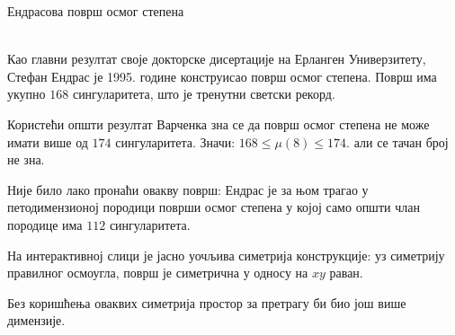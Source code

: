 \documentclass[sr]{./../../common/SurferDesc}%
\begin{document}
\footnotesize




\begin{surferPage}
  \begin{surferTitle}Ендрасова површ осмог степена\end{surferTitle} \\
    Као главни резултат своје докторске дисертације на Ерланген Универзитету, 
	Стефан Ендрас је 1995. године конструисао површ осмог степена.
    Површ има укупно $168$ сингуларитета, што је тренутни светски рекорд. 
  
    Користећи општи резултат Варченка зна се да површ осмог степена не може имати 
    више од  $174$ сингуларитета.
    Значи: $168 \le \mu(8) \le 174$. 
    али се тачан број не зна.

    Није било лако пронаћи овакву површ: Ендрас је за њом трагао у петодимензионој 
    породици површи осмог степена у којој само општи члан породице има 
    $112$ сингуларитета.

    На интерактивној слици је јасно уочљива симетрија конструкције: 
    уз симетрију правилног осмоугла, површ је симетрична у односу на $xy$ раван.

    Без коришћења оваквих симетрија простор за претрагу би био још више димензије.
  \begin{surferText}
     \end{surferText}
\end{surferPage}
\end{document}
